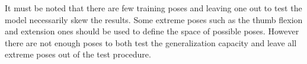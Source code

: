 It must be noted that there are few training poses and leaving one out to test the model necessarily skew the results. Some extreme poses such as the thumb flexion and extension ones should be used to define the space of possible poses. However there are not enough poses to both test the generalization capacity and leave all extreme poses out of the test procedure. 


